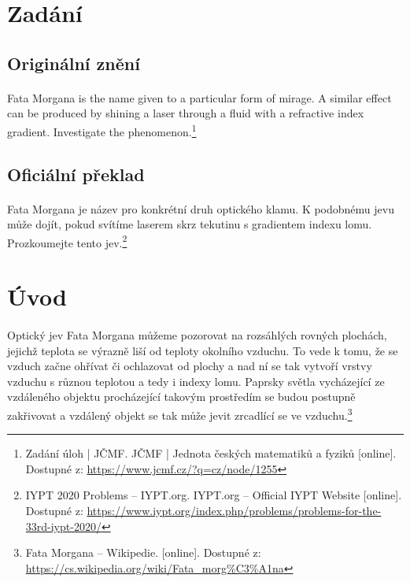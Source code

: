 \documentclass[10pt,a4paper]{article}
\begin{document}
\newpage

\section{Zadání}

\subsection{Originální znění}

\paragraph{}
Fata Morgana is the name given to a particular form of mirage. A similar effect can be produced by shining a laser through a fluid with a refractive index gradient. Investigate the phenomenon.\footnote{Zadání úloh | JČMF. JČMF | Jednota českých matematiků a fyziků [online]. Dostupné z: \url{https://www.jcmf.cz/?q=cz/node/1255}}

\subsection{Oficiální překlad}

\paragraph{}
Fata Morgana je název pro konkrétní druh optického klamu. K podobnému jevu může dojít, pokud svítíme laserem skrz tekutinu s gradientem indexu lomu. Prozkoumejte tento jev.\footnote{IYPT 2020 Problems – IYPT.org. IYPT.org – Official IYPT Website [online]. Dostupné z: \url{https://www.iypt.org/index.php/problems/problems-for-the-33rd-iypt-2020/}}


\section{Úvod}
\paragraph{}
Optický jev Fata Morgana můžeme pozorovat na rozsáhlých rovných plochách, jejichž teplota se výrazně liší od teploty okolního vzduchu. To vede k tomu, že se vzduch začne ohřívat či ochlazovat od plochy a nad ní se tak vytvoří vrstvy vzduchu s různou teplotou a tedy i indexy lomu. Paprsky světla vycházející ze vzdáleného objektu procházející takovým prostředím se budou postupně zakřivovat a vzdálený objekt se tak může jevit zrcadlící se ve vzduchu.\footnote{Fata Morgana – Wikipedie. [online]. Dostupné z: \url{https://cs.wikipedia.org/wiki/Fata_morg\%C3\%A1na}}
\end{document}
